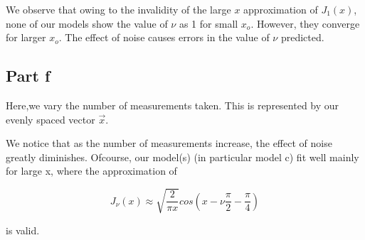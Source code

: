 \documentclass[11pt]{article}
\begin{document}
    We observe that owing to the invalidity of the large \(x\) approximation
of \(J_1(x)\), none of our models show the value of \(\nu\) as 1 for
small \(x_o\). However, they converge for larger \(x_o\). The effect of
noise causes errors in the value of \(\nu\) predicted.

    \hypertarget{part-f}{%
\subsection{Part f}\label{part-f}}

Here,we vary the number of measurements taken. This is represented by
our evenly spaced vector \(\vec{x}\).

We notice that as the number of measurements increase, the effect of
noise greatly diminishes. Ofcourse, our model(s) (in particular model c)
fit well mainly for large x, where the approximation of

\[ J_{\nu}(x)≈ \sqrt{\frac{2}{\pi x}} cos (x− \nu \frac{\pi}{2} −\frac{\pi}{4}) \]

is valid.
\end{document}
